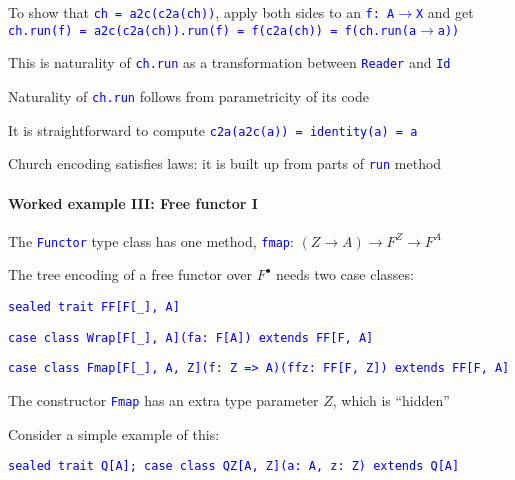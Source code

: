 To show that \texttt{\textcolor{blue}{\footnotesize{}ch = a2c(c2a(ch))}},
apply both sides to an \texttt{\textcolor{blue}{\footnotesize{}f:~A$\rightarrow$X}}
and get \texttt{\textcolor{blue}{\footnotesize{}ch.run(f) = a2c(c2a(ch)).run(f)
= f(c2a(ch)) = f(ch.run(a$\rightarrow$a))}} 

This is naturality of \texttt{\textcolor{blue}{\footnotesize{}ch.run}}
as a transformation between \texttt{\textcolor{blue}{\footnotesize{}Reader}}
and \texttt{\textcolor{blue}{\footnotesize{}Id}} 

Naturality of \texttt{\textcolor{blue}{\footnotesize{}ch.run}} follows
from parametricity of its code

It is straightforward to compute \texttt{\textcolor{blue}{\footnotesize{}c2a(a2c(a))
= identity(a) = a}} 

Church encoding satisfies laws: it is built up from parts of \texttt{\textcolor{blue}{\footnotesize{}run}}
method

\paragraph{Worked example III: Free functor I}

The \texttt{\textcolor{blue}{\footnotesize{}Functor}} type class has
one method, \texttt{\textcolor{blue}{\footnotesize{}fmap}}: $\left(Z\rightarrow A\right)\rightarrow F^{Z}\rightarrow F^{A}$ 

The tree encoding of a free functor over $F^{\bullet}$ needs two
case classes:

\texttt{\textcolor{blue}{\footnotesize{}sealed trait FF{[}F{[}\_{]},
A{]}}}{\footnotesize\par}

\texttt{\textcolor{blue}{\footnotesize{}case class Wrap{[}F{[}\_{]},
A{]}(fa: F{[}A{]}) extends FF{[}F, A{]}}}{\footnotesize\par}

\texttt{\textcolor{blue}{\footnotesize{}case class Fmap{[}F{[}\_{]},
A, Z{]}(f: Z => A)(ffz: FF{[}F, Z{]}) extends FF{[}F, A{]}}}{\footnotesize\par}

The constructor \texttt{\textcolor{blue}{\footnotesize{}Fmap}} has
an extra type parameter $Z$, which is \textsf{``}hidden\textsf{''}

Consider a simple example of this:

\texttt{\textcolor{blue}{\footnotesize{}sealed trait Q{[}A{]}; case
class QZ{[}A, Z{]}(a: A, z: Z) extends Q{[}A{]}}}{\footnotesize\par}

